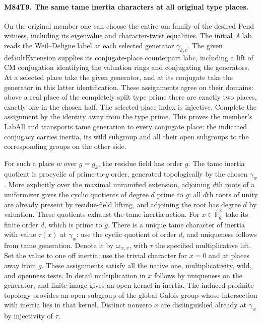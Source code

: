 \paragraph{M84T9. The same tame inertia characters at all original type places.}
On the original member one can choose the entire
$\mathrm{om}$ family of the desired $\mathrm{Pend}$ witness,
including its eigenvalue and character-twist equalities.
The initial $A.\mathrm{lab}$ reads the Weil--Deligne label
at each selected generator $\gamma_{k,v}$. The given
$\mathrm{defaultExtension}$ supplies its conjugate-place
counterpart $\mathrm{labc}$, including a lift of CM conjugation
identifying the valuation rings and conjugating the generators.
At a selected place take the given generator, and at its
conjugate take the generator in this latter identification.
These assignments agree on their domains: above a real place
of the completely split type prime there are exactly two
places, exactly one in the chosen half. The selected-place
index is injective. Complete the assignment by the identity
away from the type prime. This proves the member's
$\mathrm{LabAll}$ and transports tame generation to every
conjugate place: the indicated conjugacy carries inertia,
its wild subgroup and all their open subgroups to the
corresponding groups on the other side.

For such a place $w$ over $g=g_k$, the residue field has
order $g$. The tame inertia quotient is procyclic of
prime-to-$g$ order, generated topologically by the chosen
$\gamma_w$. More explicitly over the maximal unramified
extension, adjoining $d$th roots of a uniformizer gives
the cyclic quotients of degree $d$ prime to $g$: all
$d$th roots of unity are already present by residue-field
lifting, and adjoining the root has degree $d$ by valuation.
These quotients exhaust the tame inertia action. For
$x\in\overline{\mathbb F}_g^\times$ take its finite order
$d$, which is prime to $g$. There is a unique tame character
of inertia with value $\tau(x)$ at $\gamma_w$: use the cyclic
quotient of order $d$, and uniqueness follows from tame
generation. Denote it by $\omega_{w,x}$, with $\tau$ the
specified multiplicative lift. Set the value to one off
inertia; use the trivial character for $x=0$ and at places
away from $g$. These assignments satisfy all the native
one, multiplicativity, wild, and openness tests. In detail
multiplication in $x$ follows by uniqueness on the generator,
and finite image gives an open kernel in inertia. The
induced profinite topology provides an open subgroup of the
global Galois group whose intersection with inertia lies in
that kernel. Distinct nonzero $x$ are distinguished already at
$\gamma_w$ by injectivity of $\tau$.

